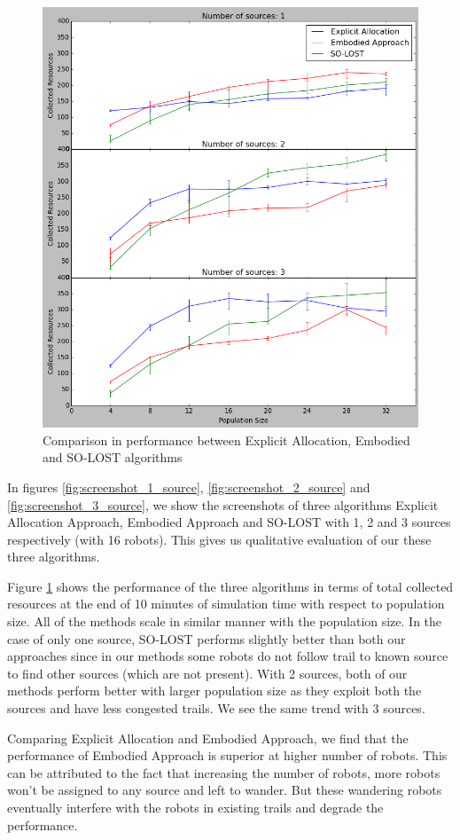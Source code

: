 \documentclass[letterpaper, 10 pt, conference]{ieeeconf}  %
\begin{document}
\begin{figure}
   \includegraphics[width=.81\linewidth]{comparison.png}
   \centering
   \caption{Comparison in performance between Explicit Allocation, Embodied and SO-LOST algorithms}
   \label{fig:comparison}
\end{figure}

In figures \ref{fig:screenshot_1_source}, \ref{fig:screenshot_2_source} and \ref{fig:screenshot_3_source}, we show the screenshots of three algorithms Explicit Allocation Approach, Embodied Approach and SO-LOST with 1, 2 and 3 sources respectively (with 16 robots). This gives us qualitative evaluation of our these three algorithms. 

Figure \ref{fig:comparison} shows the performance of the three algorithms in terms of total collected resources at the end of 10 minutes of simulation time with respect to population size. All of the methods scale in similar manner with the population size. In the case of only one source, SO-LOST performs slightly better than both our approaches since in our methods some robots do not follow trail to known source to find other sources (which are not present). With 2 sources, both of our methods perform better with larger population size as they exploit both the sources and have less congested trails. We see the same trend with 3 sources.

Comparing Explicit Allocation and Embodied Approach, we find that the performance of Embodied Approach is superior at higher number of robots. This can be attributed to the fact that increasing the number of robots, more robots won't be assigned to any source and left to wander. But these wandering robots eventually interfere with the robots in existing trails and degrade the performance. 
\end{document}
